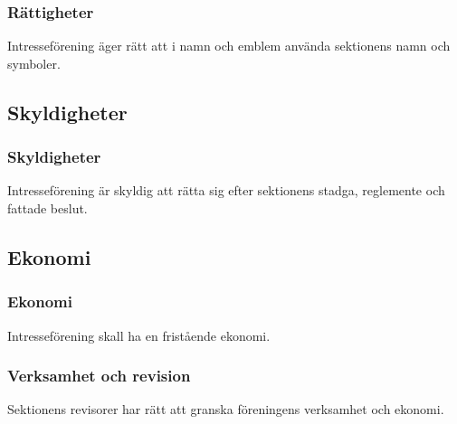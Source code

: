 \subsubsection{Rättigheter}
Intresseförening äger rätt att i namn och emblem använda sektionens namn och symboler.

\subsection{Skyldigheter}

\subsubsection{Skyldigheter}
Intresseförening är skyldig att rätta sig efter sektionens stadga, reglemente och fattade beslut.

\subsection{Ekonomi}

\subsubsection{Ekonomi}
Intresseförening skall ha en fristående ekonomi.

\subsubsection{Verksamhet och revision}
Sektionens revisorer har rätt att granska föreningens verksamhet och ekonomi.